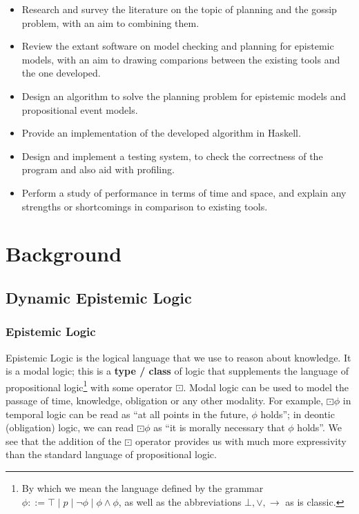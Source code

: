 \documentclass[12pt, a4paper]{article}
\begin{document}
\begin{itemize}
  \item Research and survey the literature on the topic of planning and the
    gossip problem, with an aim to combining them.
  \item Review the extant software on model checking and planning for epistemic
    models, with an aim to drawing comparions between the existing tools and the
    one developed. 
  \item Design an algorithm to solve the planning problem for epistemic models
    and propositional event models.
  \item Provide an implementation of the developed algorithm in Haskell.
  \item Design and implement a testing system, to check the correctness of the
    program and also aid with profiling.
  \item Perform a study of performance in terms of time and space, and explain
    any strengths or shortcomings in comparison to existing tools. 
\end{itemize}


\newpage

\section{Background}

\subsection{Dynamic Epistemic Logic}
\label{subsec:DEL}

\subsubsection{Epistemic Logic}

Epistemic Logic is the logical language that we use to reason about knowledge.
It is a modal logic; this is a \textbf{type / class} of logic that supplements
the language of propositional logic\footnote{By which we mean the language
  defined by the grammar $\phi ::= \top \mid p \mid \neg \phi \mid \phi \land
  \phi$, as well as the abbreviations $\bot, \lor, \rightarrow$ as is classic.}
with some operator $\boxdot$. Modal logic can be used to model the passage of
time, knowledge, obligation or any other modality. For example, $\boxdot \phi$
in temporal logic can be read as ``at all points in the future, $\phi$ holds'';
in deontic (obligation) logic, we can read $\boxdot \phi$ as ``it is morally
necessary that $\phi$ holds''. We see that the addition of the $\boxdot$
operator provides us with much more expressivity than the standard language of
propositional logic.
\end{document}
